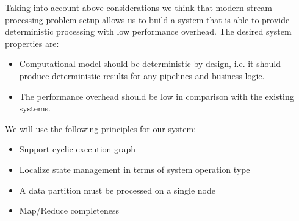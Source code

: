 Taking into account above considerations we think that modern stream processing problem setup allows us to build a system that is able to provide deterministic processing with low performance overhead. The desired system properties are:
\begin{itemize}
    \item Computational model should be deterministic by design, i.e. it should produce deterministic results for any pipelines and business-logic.
    \item The performance overhead should be low in comparison with the existing systems.
\end{itemize}
We will use the following principles for our system:
\begin{itemize}
    \item Support cyclic execution graph
    \item Localize state management in terms of system operation type
    \item A data partition must be processed on a single node
    \item Map/Reduce completeness
\end{itemize}
